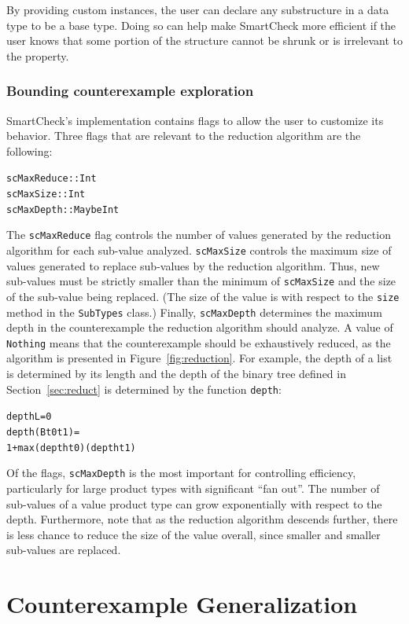 \documentclass[10pt]{sigplanconf}
\newenvironment{code}{\begin{alltt}}{\end{alltt}}
\newcommand{\ttp}[1]{\texttt{#1}}
\begin{document}
By providing custom instances, the user can declare any substructure in a data
type to be a base type.  Doing so can help make SmartCheck more efficient if the
user knows that some portion of the structure cannot be shrunk or is irrelevant
to the property.

\subsubsection{Bounding counterexample exploration}

SmartCheck's implementation contains flags to allow the user to customize its
behavior.  Three flags that are relevant to the reduction algorithm are the
following:
%
\begin{code}
scMaxReduce :: Int
scMaxSize   :: Int
scMaxDepth  :: Maybe Int
\end{code}
%
\noindent
The \ttp{scMaxReduce} flag controls the number of values generated by the
reduction algorithm for each sub-value analyzed.  \ttp{scMaxSize} controls the
maximum size of values generated to replace sub-values by the reduction
algorithm.  Thus, new sub-values must be strictly smaller than the minimum of
\ttp{scMaxSize} and the size of the sub-value being replaced.  (The size of the
value is with respect to the \ttp{size} method in the \ttp{SubTypes} class.)
Finally, \ttp{scMaxDepth} determines the maximum depth in the counterexample the
reduction algorithm should analyze.  A value of \ttp{Nothing} means that the
counterexample should be exhaustively reduced, as the algorithm is presented in
Figure~\ref{fig:reduction}.  For example, the depth of a list is determined by
its length and the depth of the binary tree defined in Section~\ref{sec:reduct}
is determined by the function \ttp{depth}:
%
\begin{code}
depth L         = 0
depth (B t0 t1) =
  1 + max (depth t0) (depth t1)
\end{code}
%
\noindent
Of the flags, \ttp{scMaxDepth} is the most important for controlling
efficiency, particularly for large product types with significant ``fan out''.
The number of sub-values of a value product type can grow exponentially with
respect to the depth.  Furthermore, note that as the reduction algorithm
descends further, there is less chance to reduce the size of the value overall,
since smaller and smaller sub-values are replaced.

\section{Counterexample Generalization} \label{sec:generalization}
\end{document}
